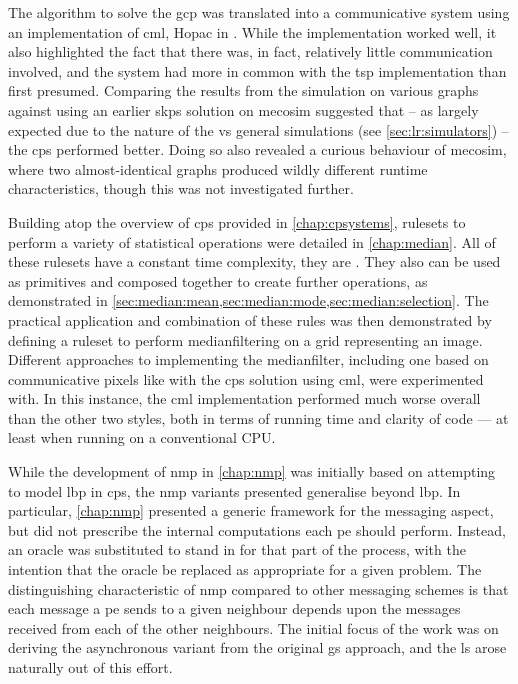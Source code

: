 The algorithm to solve the \gls{gcp} was translated into a communicative system using an implementation of \gls{cml}, Hopac in \fsharp{}.  While the implementation worked well, it also highlighted the fact that there was, in fact, relatively little communication involved, and the system had more in common with the \gls{tsp} implementation than first presumed.  Comparing the results from the simulation on various graphs against using an earlier \gls{skps} solution on \gls{mecosim} suggested that -- as largely expected due to the nature of the \adhoc{} vs general simulations (see \vref{sec:lr:simulators}) -- the \gls{cps} performed better.  Doing so also revealed a curious behaviour of \gls{mecosim}, where two almost-identical graphs produced wildly different runtime characteristics, though this was not investigated further.

Building atop the overview of \gls{cps} provided in \cref{chap:cpsystems}, \glspl{ruleset} to perform a variety of statistical operations were detailed in \cref{chap:median}.  All of these rulesets have a constant time complexity, \ie{} they are .  They also can be used as primitives and composed together to create further operations, as demonstrated in \eg{} \cref{sec:median:mean,sec:median:mode,sec:median:selection}.  The practical application and combination of these rules was then demonstrated by defining a ruleset to perform \gls{medianfilter}ing on a grid representing an image.  Different approaches to implementing the \gls{medianfilter}, including one based on communicative pixels like with the \gls{cps} solution using \gls{cml}, were experimented with.  In this instance, the \gls{cml} implementation performed much worse overall than the other two styles, both in terms of running time and clarity of code --- at least when running on a conventional CPU.

While the development of \gls{nmp} in \cref{chap:nmp} was initially based on attempting to model \gls{lbp} in \gls{cps}, the \gls{nmp} variants presented generalise beyond \gls{lbp}.  In particular, \cref{chap:nmp} presented a generic framework for the messaging aspect, but did not prescribe the internal computations each \gls{pe} should perform.  Instead, an oracle was substituted to stand in for that part of the process, with the intention that the oracle be replaced as appropriate for a given problem.  The distinguishing characteristic of \gls{nmp} compared to other messaging schemes is that each message a \gls{pe} sends to a given neighbour depends upon the messages received from each of the other neighbours.  The initial focus of the work was on deriving the asynchronous variant from the original \gls{gs} approach, and the \gls{ls} arose naturally out of this effort.

